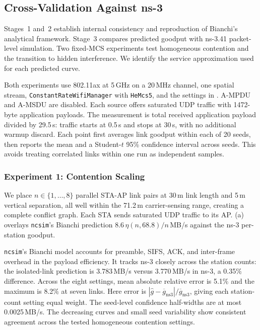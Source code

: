 \documentclass[conference]{IEEEtran}
\newcommand{\ncsim}{\texttt{ncsim}}
\begin{document}
\subsection{Cross-Validation Against ns-3}
\label{sec:ns3_validation}

Stages~1 and~2 establish internal consistency and reproduction of Bianchi's
analytical framework. Stage~3 compares predicted goodput with ns-3.41
packet-level simulation. Two fixed-MCS experiments test homogeneous
contention and the transition to hidden interference. We identify the
service approximation used for each predicted curve.

Both experiments use 802.11ax at 5\,GHz on a 20\,MHz channel, one spatial
stream, \texttt{ConstantRateWifiManager} with \texttt{HeMcs5}, and the
settings in . A-MPDU and A-MSDU are disabled.
Each source offers saturated UDP traffic with 1472-byte application payloads.
The measurement is total received application payload divided by 29.5\,s:
traffic starts at 0.5\,s and stops at 30\,s, with no additional warmup
discard. Each point first averages link goodput within each of 20 seeds,
then reports the mean and a Student-$t$ 95\% confidence interval across seeds.
This avoids treating correlated links within one run as independent samples.

\subsubsection{Experiment 1: Contention Scaling}

We place $n \in \{1, \ldots, 8\}$ parallel STA-AP link pairs at 30\,m
link length and 5\,m vertical separation, all well within the 71.2\,m
carrier-sensing range, creating a complete conflict graph.  Each STA sends
saturated UDP traffic to its AP.  (a) overlays
\ncsim{}'s Bianchi prediction $8.6\,\eta(n,68.8)/n$\,MB/s against the
ns-3 per-station goodput.

\ncsim{}'s Bianchi model accounts for preamble, SIFS, ACK, and inter-frame
overhead in the payload efficiency. It tracks ns-3 closely across the
station counts: the isolated-link prediction is 3.783\,MB/s versus
3.770\,MB/s in ns-3, a 0.35\% difference. Across the eight settings, mean
absolute relative error is 5.1\% and the maximum is 8.2\% at seven links.
Here error is $|\widehat g-\overline g_{\mathrm{ns3}}|/
\overline g_{\mathrm{ns3}}$, giving each station-count setting equal weight.
The seed-level confidence half-widths are at most 0.0025\,MB/s. The
decreasing curves and small seed variability show consistent agreement
across the tested homogeneous contention settings.
\end{document}

